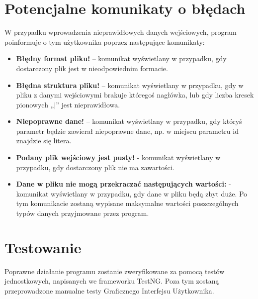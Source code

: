 \documentclass{article}
\begin{document}
\section{Potencjalne komunikaty o błędach}
    W przypadku wprowadzenia nieprawidłowych danych wejściowych, program poinformuje o tym użytkownika poprzez następujące komunikaty:
    \begin{itemize}
        \item \textbf{Błędny format pliku!} – komunikat wyświetlany w przypadku, gdy dostarczony plik jest w nieodpowiednim formacie.

        \item \textbf{Błędna struktura pliku!} – komunikat wyświetlany w przypadku, gdy
        w pliku z danymi wejściowymi brakuje któregoś nagłówka, lub gdy liczba
        kresek pionowych „$|$” jest nieprawidłowa.

        \item \textbf{Niepoprawne dane!} – komunikat wyświetlany w przypadku, gdy któryś
        parametr będzie zawierał niepoprawne dane, np. w miejscu parametru id
        znajdzie się litera.

        \item \textbf{Podany plik wejściowy jest pusty!} - komunikat wyświetlany w przypadku, gdy dostarczony plik nie ma zawartości.
        
        \item \textbf{Dane w pliku nie mogą przekraczać następujących wartości:} - komunikat wyświetlany w przypadku, gdy dane w pliku będą zbyt duże. Po tym komunikacie zostaną wypisane maksymalne wartości poszczególnych typów danych przyjmowane przez program.
    \end{itemize}

\section{Testowanie}
    Poprawne działanie programu zostanie zweryfikowane za pomocą testów jednostkowych, napisanych we frameworku TestNG. Poza tym zostaną przeprowadzone manualne testy Graficznego Interfejsu Użytkownika.
\end{document}
